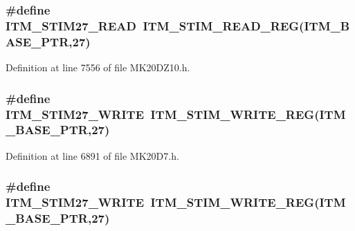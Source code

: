 \subsubsection[{\texorpdfstring{I\+T\+M\+\_\+\+S\+T\+I\+M27\+\_\+\+R\+E\+AD}{ITM_STIM27_READ}}]{\setlength{\rightskip}{0pt plus 5cm}\#define I\+T\+M\+\_\+\+S\+T\+I\+M27\+\_\+\+R\+E\+AD~{\bf I\+T\+M\+\_\+\+S\+T\+I\+M\+\_\+\+R\+E\+A\+D\+\_\+\+R\+EG}({\bf I\+T\+M\+\_\+\+B\+A\+S\+E\+\_\+\+P\+TR},27)}\hypertarget{group___i_t_m___register___accessor___macros_gad396bfbe5ecd26d08ddcdeb9102e28d2}{}\label{group___i_t_m___register___accessor___macros_gad396bfbe5ecd26d08ddcdeb9102e28d2}


Definition at line 7556 of file M\+K20\+D\+Z10.\+h.

\subsubsection[{\texorpdfstring{I\+T\+M\+\_\+\+S\+T\+I\+M27\+\_\+\+W\+R\+I\+TE}{ITM_STIM27_WRITE}}]{\setlength{\rightskip}{0pt plus 5cm}\#define I\+T\+M\+\_\+\+S\+T\+I\+M27\+\_\+\+W\+R\+I\+TE~{\bf I\+T\+M\+\_\+\+S\+T\+I\+M\+\_\+\+W\+R\+I\+T\+E\+\_\+\+R\+EG}({\bf I\+T\+M\+\_\+\+B\+A\+S\+E\+\_\+\+P\+TR},27)}\hypertarget{group___i_t_m___register___accessor___macros_gae1575242a2ddb0a6d0089f2f49072265}{}\label{group___i_t_m___register___accessor___macros_gae1575242a2ddb0a6d0089f2f49072265}


Definition at line 6891 of file M\+K20\+D7.\+h.

\subsubsection[{\texorpdfstring{I\+T\+M\+\_\+\+S\+T\+I\+M27\+\_\+\+W\+R\+I\+TE}{ITM_STIM27_WRITE}}]{\setlength{\rightskip}{0pt plus 5cm}\#define I\+T\+M\+\_\+\+S\+T\+I\+M27\+\_\+\+W\+R\+I\+TE~{\bf I\+T\+M\+\_\+\+S\+T\+I\+M\+\_\+\+W\+R\+I\+T\+E\+\_\+\+R\+EG}({\bf I\+T\+M\+\_\+\+B\+A\+S\+E\+\_\+\+P\+TR},27)}\hypertarget{group___i_t_m___register___accessor___macros_gae1575242a2ddb0a6d0089f2f49072265}{}\label{group___i_t_m___register___accessor___macros_gae1575242a2ddb0a6d0089f2f49072265}


